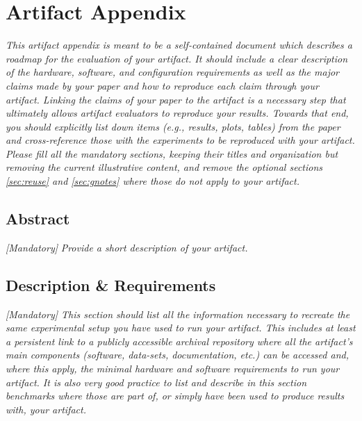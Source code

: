 %

\appendix
\section{Artifact Appendix} 
\textit{This artifact appendix is meant to be a self-contained document which describes a roadmap for the evaluation of your artifact. It should include a clear description of the hardware, software, and configuration requirements as well as the major claims made by your paper and how to reproduce each claim through your artifact. Linking the claims of your paper to the artifact is a necessary step that ultimately allows artifact evaluators to reproduce your results. Towards that end, you should explicitly list down items (e.g., results, plots, tables) from the paper and cross-reference those with the experiments to be reproduced with your artifact.}\\
\textit{Please fill all the mandatory sections, keeping their titles and organization but removing the current illustrative content, and remove the optional sections \ref{sec:reuse} and \ref{sec:gnotes} where those do not apply to your artifact.}


\subsection{Abstract}
{\em [Mandatory]} 
{\em Provide a short description of your artifact.}

\subsection{Description \& Requirements}

\textit{[Mandatory] This section should list all the information necessary to recreate the same experimental setup you have used to run your artifact. This includes at least a persistent link to a publicly accessible archival repository where all the artifact's main components (software, data-sets, documentation, etc.) can be accessed and, where this apply, the minimal hardware and software requirements to run your artifact. It is also very good practice to list and describe in this section benchmarks where those are part of, or simply have been used to produce results with, your artifact.}

